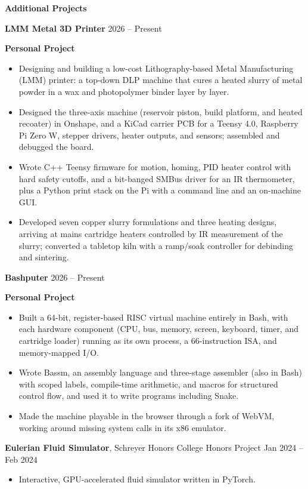 \begin{center}
    \textbf{Additional Projects}
\end{center}
\textbf{LMM Metal 3D Printer} \hfill 2026 -- Present

\textbf{Personal Project}\\
\begin{itemize}[noitemsep, topsep=0pt, partopsep=0pt, parsep=0pt]
    \item Designing and building a low-cost Lithography-based Metal Manufacturing (LMM) printer: a top-down DLP machine that cures a heated slurry of metal powder in a wax and photopolymer binder layer by layer.

    \item Designed the three-axis machine (reservoir piston, build platform, and heated recoater) in Onshape, and a KiCad carrier PCB for a Teensy 4.0, Raspberry Pi Zero W, stepper drivers, heater outputs, and sensors; assembled and debugged the board.

    \item Wrote C++ Teensy firmware for motion, homing, PID heater control with hard safety cutoffs, and a bit-banged SMBus driver for an IR thermometer, plus a Python print stack on the Pi with a command line and an on-machine GUI.

    \item Developed seven copper slurry formulations and three heating designs, arriving at mains cartridge heaters controlled by IR measurement of the slurry; converted a tabletop kiln with a ramp/soak controller for debinding and sintering.
\end{itemize}

\vspace{12pt}

\textbf{Bashputer} \hfill 2026 -- Present

\textbf{Personal Project}\\
\begin{itemize}[noitemsep, topsep=0pt, partopsep=0pt, parsep=0pt]
    \item Built a 64-bit, register-based RISC virtual machine entirely in Bash, with each hardware component (CPU, bus, memory, screen, keyboard, timer, and cartridge loader) running as its own process, a 66-instruction ISA, and memory-mapped I/O.

    \item Wrote Bassm, an assembly language and three-stage assembler (also in Bash) with scoped labels, compile-time arithmetic, and macros for structured control flow, and used it to write programs including Snake.

    \item Made the machine playable in the browser through a fork of WebVM, working around missing system calls in its x86 emulator.
\end{itemize}

\vspace{12pt}

\textbf{Eulerian Fluid Simulator}, Schreyer Honors College Honors Project \hfill Jan 2024 -- Feb 2024
\begin{itemize}[noitemsep, topsep=0pt, partopsep=0pt, parsep=0pt]
    \item Interactive, GPU-accelerated fluid simulator written in PyTorch.
\end{itemize}
